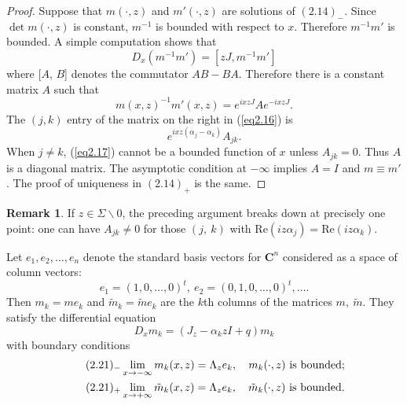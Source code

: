 \documentclass{surv-l}
\theoremstyle{plain}
\theoremstyle{definition}
\newtheorem{remark}[theorem]{Remark}
\numberwithin{equation}{chapter}
\begin{document}
\begin{proof}
 Suppose that $m(\cdot, z)$ and $m'(\cdot,z)$ are solutions of $(\hyperref[eq2.14-]{2.14})_{-}$. Since $\det m(\cdot, z)$ is constant, $m^{-1}$ is bounded with respect to $x$. Therefore $m^{-1}m'$ is bounded. A simple computation shows that
\begin{equation*}
D_{x}(m^{-1}m')=[zJ, m^{-1}m']
\end{equation*}
where [$A$, $B$] denotes the commutator $AB-BA$. Therefore there is a constant matrix $A$ such that
\setcounter{equation}{15}
\begin{equation}\label{eq2.16}
m(x, z)^{-1}m'(x,z)=e^{ixzJ}Ae^{-ixzJ}.
\end{equation}
The $(j, k)$ entry of the matrix on the right in (\ref{eq2.16}) is
\begin{equation}\label{eq2.17}
e^{ixz(\alpha_{j}-\alpha_{k})}A_{j k}.
\end{equation}
When $j\neq k$, (\ref{eq2.17}) cannot be a bounded function of $x$ unless $A_{j k}=0$. Thus $A$ is a diagonal matrix. The asymptotic condition at $-\infty$ implies $A=I$ and $m\equiv m'$. The proof of uniqueness in $(\hyperref[eq2.14+]{2.14})_{+}$ is the same.
\end{proof}
\setcounter{theorem}{17}
\begin{remark}\label{eq2.18}
If $z\in\Sigma\backslash 0$, the preceding argument breaks down at precisely one point: one can have $A_{j k}\neq 0$ for those $(j,\ k)$ with $\mathrm{Re}(iz\alpha_{j})=\mathrm{Re}(iz\alpha_{k})$.
\end{remark}
Let $e_{1}, e_{2}, \ldots , e_{n}$ denote the standard basis vectors for $\mathbf{C}^{n}$ considered as a space of column vectors:
\setcounter{equation}{18}
\begin{equation}\label{eq2.19}
e_{1}=(1,0,\ldots,0)^{t},\ e_{2}=(0,1,0,\ldots, 0)^{t}, \ldots.
\end{equation}
Then $m_{k}=me_{k}$ and $\tilde{m}_{k}=\tilde{m}e_{k}$ are the $k$th columns of the matrices $m,\ \tilde{m}$. They satisfy the differential equation
\begin{equation}\label{eq2.20}
D_{x}m_{k}=(J_{z}-\alpha_{k}zI+q)m_{k}
\end{equation}
with boundary conditions\label{eq2.21-}
\begin{align*}\tag*{$(2.21)_{-}$}
& \mathop\mathrm{lim}_{x\rightarrow-\infty} m_{k}(x,z)=\Lambda_{z}e_{k},\quad m_{k}(\cdot,z)\ \text{is bounded}; \\
\label{eq2.21+}\tag*{$(2.21)_{+}$}&  \mathop\mathrm{lim}_{x\rightarrow+\infty}\tilde{m}_{k}(x,z)=\Lambda_{z}e_{k},\quad\tilde{m}_{k}(\cdot,z)\ \text{is bounded}.
\end{align*}
\end{document}
